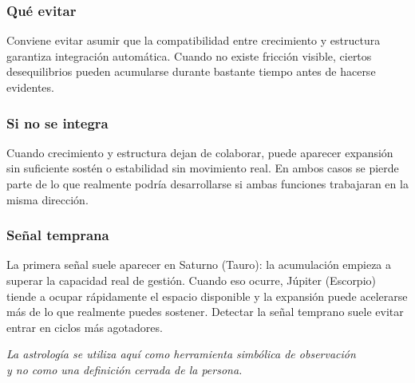 \documentclass[11pt,a4paper]{article}
\begin{document}
\subsubsection*{Qué evitar}

Conviene evitar asumir que la compatibilidad entre crecimiento y estructura garantiza integración automática. Cuando no existe fricción visible, ciertos desequilibrios pueden acumularse durante bastante tiempo antes de hacerse evidentes.

\subsubsection*{Si no se integra}

Cuando crecimiento y estructura dejan de colaborar, puede aparecer expansión sin suficiente sostén o estabilidad sin movimiento real. En ambos casos se pierde parte de lo que realmente podría desarrollarse si ambas funciones trabajaran en la misma dirección.

\subsubsection*{Señal temprana}

La primera señal suele aparecer en Saturno (Tauro): la acumulación empieza a superar la capacidad real de gestión. Cuando eso ocurre, Júpiter (Escorpio) tiende a ocupar rápidamente el espacio disponible y la expansión puede acelerarse más de lo que realmente puedes sostener. Detectar la señal temprano suele evitar entrar en ciclos más agotadores.

\vfill

\begin{center}
{\small\itshape\color{grisai}
La astrología se utiliza aquí como herramienta simbólica de observación\\
y no como una definición cerrada de la persona.
}
\end{center}
\end{document}
